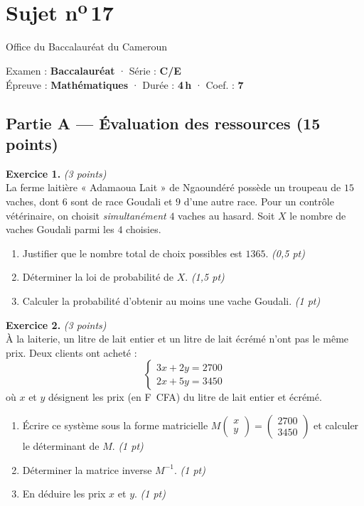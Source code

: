 \section{Sujet n\textsuperscript{o}\,17}
\noindent\begin{minipage}{0.5\linewidth}\footnotesize Office du Baccalauréat du Cameroun\end{minipage}%
\hfill\begin{minipage}{0.45\linewidth}\footnotesize\raggedleft Examen : \textbf{Baccalauréat} · Série : \textbf{C/E}\\
Épreuve : \textbf{Mathématiques} · Durée : \textbf{4\,h} · Coef. : \textbf{7}\end{minipage}
\par\smallskip{\color{onbo}\rule{\linewidth}{1pt}}

\subsection*{Partie A — Évaluation des ressources \hfill (15 points)}

\noindent\textbf{Exercice 1.} \hfill\textit{(3 points)}\\
La ferme laitière « Adamaoua Lait » de Ngaoundéré possède un troupeau de $15$ vaches,
dont $6$ sont de race Goudali et $9$ d'une autre race. Pour un contrôle vétérinaire,
on choisit \emph{simultanément} $4$ vaches au hasard. Soit $X$ le nombre de vaches
Goudali parmi les $4$ choisies.
\begin{enumerate}[label=\arabic*)]
\item Justifier que le nombre total de choix possibles est $1365$. \hfill\textit{(0,5 pt)}
\item Déterminer la loi de probabilité de $X$. \hfill\textit{(1,5 pt)}
\item Calculer la probabilité d'obtenir au moins une vache Goudali. \hfill\textit{(1 pt)}
\end{enumerate}

\smallskip
\noindent\textbf{Exercice 2.} \hfill\textit{(3 points)}\\
À la laiterie, un litre de lait entier et un litre de lait écrémé n'ont pas le même
prix. Deux clients ont acheté :
\[
\left\{\begin{array}{l}
3x+2y=2700\\[2pt]
2x+5y=3450
\end{array}\right.
\]
où $x$ et $y$ désignent les prix (en F~CFA) du litre de lait entier et écrémé.
\begin{enumerate}[label=\arabic*)]
\item Écrire ce système sous la forme matricielle $M\!\begin{pmatrix}x\\y\end{pmatrix}=\begin{pmatrix}2700\\3450\end{pmatrix}$
et calculer le déterminant de $M$. \hfill\textit{(1 pt)}
\item Déterminer la matrice inverse $M^{-1}$. \hfill\textit{(1 pt)}
\item En déduire les prix $x$ et $y$. \hfill\textit{(1 pt)}
\end{enumerate}

